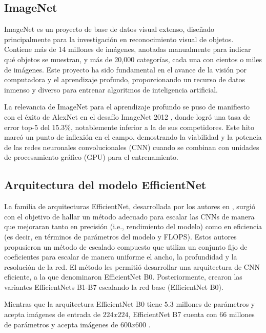 \subsection{ImageNet}

ImageNet es un proyecto de base de datos visual extenso, diseñado principalmente para la investigación en reconocimiento visual de objetos. Contiene más de 14 millones de imágenes, anotadas manualmente para indicar qué objetos se muestran, y más de 20,000 categorías, cada una con cientos o miles de imágenes. Este proyecto ha sido fundamental en el avance de la visión por computadora y el aprendizaje profundo, proporcionando un recurso de datos inmenso y diverso para entrenar algoritmos de inteligencia artificial.

La relevancia de ImageNet para el aprendizaje profundo se puso de manifiesto con el éxito de AlexNet en el desafío ImageNet 2012 , donde logró una tasa de error top-5 del 15.3\%, notablemente inferior a la de sus competidores. Este hito marcó un punto de inflexión en el campo, demostrando la viabilidad y la potencia de las redes neuronales convolucionales (CNN) cuando se combinan con unidades de procesamiento gráfico (GPU) para el entrenamiento.

\subsection{Arquitectura del modelo EfficientNet}

La familia de arquitecturas EfficientNet, desarrollada por los autores en , surgió con el objetivo de hallar un método adecuado para escalar las CNNs de manera que mejoraran tanto en precisión (i.e., rendimiento del modelo) como en eficiencia (es decir, en términos de parámetros del modelo y FLOPS). Estos autores propusieron un método de escalado compuesto que utiliza un conjunto fijo de coeficientes para escalar de manera uniforme el ancho, la profundidad y la resolución de la red. El método les permitió desarrollar una arquitectura de CNN eficiente, a la que denominaron EfficientNet B0. Posteriormente, crearon las variantes EfficientNets B1-B7 escalando la red base (EfficientNet B0).

Mientras que la arquitectura EfficientNet B0 tiene $5.3$ millones de parámetros y acepta imágenes de entrada de $224x224$, EfficientNet B7 cuenta con $66$ millones de parámetros y acepta imágenes de $600x600$ .

